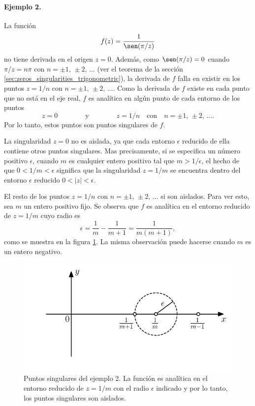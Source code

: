 \documentclass[a4paper]{report}
\begin{document}
\paragraph{Ejemplo 2.} La función
\[
 f(z)=\frac{1}{\sen(\pi/z)}
\]
no tiene derivada en el origen \(z=0\). Además, como \(\sen(\pi/z)=0\) cuando \(\pi/z=n\pi\) con \(n=\pm1,\,\pm2,\,\dots\) (ver el teorema de la sección \ref{sec:zeros_singularities_trigonometric}), la derivada de \(f\) falla en existir en los puntos \(z=1/n\) con \(n=\pm1,\,\pm2,\,\dots\). Como la derivada de \(f\) existe en cada punto que no está en el eje real, \(f\) es analítica en algún punto de cada entorno de los puntos
\[
 z=0
 \qquad\qquad\textrm{y}\qquad\qquad
 z=1/n
 \quad\textrm{con}\quad
 n=\pm1,\,\pm2,\,\dots.
\]
Por lo tanto, estos puntos son puntos singulares de \(f\).

La singularidad \(z=0\) no es aislada, ya que cada entorno \(\epsilon\) reducido de ella contiene otros puntos singulares. Mas precisamente, si se especifica un número positivo \(\epsilon\), cuando \(m\) es cualquier entero positivo tal que \(m>1/\epsilon\), el hecho de que \(0<1/m<\epsilon\) significa que la singularidad \(z=1/m\) se encuentra dentro del entorno \(\epsilon\) reducido \(0<|z|<\epsilon\).

El resto de los puntos \(z=1/n\) con \(n=\pm1,\,\pm2,\,\dots\) si son aislados. Para ver esto, sea \(m\) un entero positivo fijo. Se observa que \(f\) es analítica en el entorno reducido de \(z=1/m\) cuyo radio es 
\[
 \epsilon=\frac{1}{m}-\frac{1}{m+1}=\frac{1}{m(m+1)},
\]
como se muestra en la figura \ref{fig:example_75_03}. La misma observación puede hacerse cuando \(m\) es un entero negativo.
\begin{figure}[!htb]
  \begin{minipage}[c]{0.55\textwidth}
    \includegraphics[width=\textwidth]{figuras/example_75_03.pdf}
  \end{minipage}\hfill
  \begin{minipage}[c]{0.35\textwidth}
    \caption{
       Puntos singulares del ejemplo 2. La función es analítica en el entorno reducido de \(z=1/m\) con el radio \(\epsilon\) indicado y por lo tanto, los puntos singulares son aislados.
    } \label{fig:example_75_03}
  \end{minipage}
\end{figure}
\end{document}
